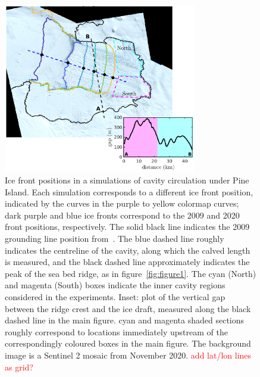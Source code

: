\documentclass[draft]{agujournal2019}
\newcommand{\red}[1]{\textcolor{red}{#1}}
\begin{document}
\begin{figure}
    \centering
    \includegraphics[width = 0.75\textwidth]{../make_figures/plots/figure10.eps}
    \caption{Ice front positions in a simulations of cavity circulation under Pine Island. Each simulation corresponds to a different ice front position, indicated by the curves in the purple to yellow colormap curves; dark purple and blue ice fronts correspond to the 2009 and 2020 front positions, respectively. The solid black line indicates the 2009 grounding line position from~\cite{Joughin2010GRL}. The blue dashed line roughly indicates the centreline of the cavity, along which the calved length is measured, and the black dashed line approximately indicates the peak of the sea bed ridge, as in figure~\ref{fig:figure1}. The cyan (North) and magenta (South) boxes indicate the inner cavity regions considered in the experiments. Inset: plot of the vertical gap between the ridge crest and the ice draft, measured along the black dashed line in the main figure. cyan and magenta shaded sections roughly correspond to locations immediately upstream of the correspondingly coloured boxes in the main figure. The background image is a Sentinel 2 mosaic from November 2020. \red{add lat/lon lines as grid?}}
    \label{fig:figure10}
\end{figure}

\end{document}
